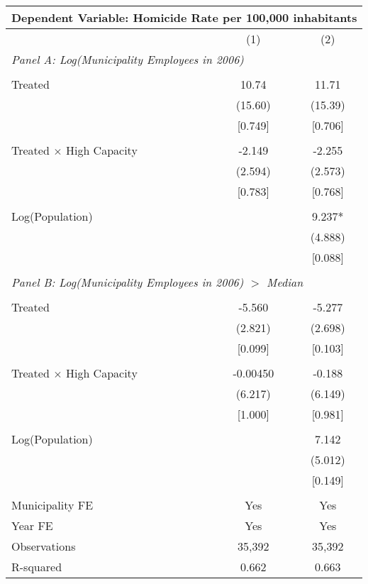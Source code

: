 \documentclass[]{article}
\begin{document}
\begin{table}[htbp]
\begin{tabular}{lcc}
\toprule
\multicolumn{3}{c}{Dependent Variable: Homicide Rate per 100,000 inhabitants} \\
\midrule
 & (1) & (2) \\
\midrule
\multicolumn{3}{l}{\textit{Panel A: Log(Municipality Employees in 2006)}} \\\\
Treated & 10.74 & 11.71 \\
 & (15.60) & (15.39) \\
 & [0.749] & [0.706] \\\\
Treated $\times$ High Capacity & -2.149 & -2.255 \\
 & (2.594) & (2.573) \\
 & [0.783] & [0.768] \\\\
Log(Population) &  & 9.237* \\
 &  & (4.888) \\
 &  & [0.088] \\\\
\midrule
\multicolumn{3}{l}{\textit{Panel B: Log(Municipality Employees in 2006) $>$ Median}} \\\\
Treated & -5.560 & -5.277 \\
 & (2.821) & (2.698) \\
 & [0.099] & [0.103] \\\\
Treated $\times$ High Capacity & -0.00450 & -0.188 \\
 & (6.217) & (6.149) \\
 & [1.000] & [0.981] \\\\
Log(Population) &  & 7.142 \\
 &  & (5.012) \\
 &  & [0.149] \\\\
\midrule
Municipality FE & Yes & Yes \\
Year FE & Yes & Yes \\
Observations & 35,392 & 35,392 \\
R-squared & 0.662 & 0.663 \\
\bottomrule
\end{tabular}
\end{table}
\end{document}
